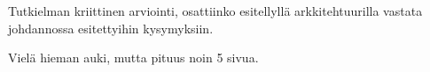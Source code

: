 Tutkielman kriittinen arviointi, osattiinko esitellyllä arkkitehtuurilla vastata johdannossa esitettyihin kysymyksiin.

Vielä hieman auki, mutta pituus noin 5 sivua.
